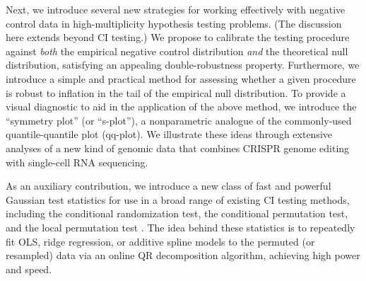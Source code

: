 \documentclass[12pt]{article}
\begin{document}
Next, we introduce several new strategies for working effectively with negative control data in high-multiplicity hypothesis testing problems. (The discussion here extends beyond CI testing.) We propose to calibrate the testing procedure against \textit{both} the empirical negative control distribution \textit{and} the theoretical null distribution, satisfying an appealing double-robustness property. Furthermore, we introduce a simple and practical method for assessing whether a given procedure is robust to inflation in the tail of the empirical null distribution. To provide a visual diagnostic to aid in the application of the above method, we introduce the ``symmetry plot'' (or ``s-plot''), a nonparametric analogue of the commonly-used quantile-quantile plot (qq-plot). %
We illustrate these ideas through extensive analyses of a new kind of genomic data that combines CRISPR genome editing with single-cell RNA sequencing.

As an auxiliary contribution, we introduce a new class of fast and powerful Gaussian test statistics for use in a broad range of existing CI testing methods, including the conditional randomization test, the conditional permutation test, and the local permutation test \parencite{Candes2018a,Berrett2020,Kim2021}. The idea behind these statistics is to repeatedly fit OLS, ridge regression, or additive spline models to the permuted (or resampled) data via an online QR decomposition algorithm, achieving high power and speed.

\printbibliography
 
\end{document}
